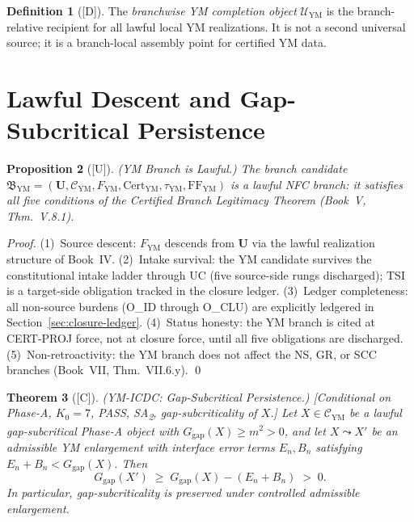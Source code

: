 \documentclass[12pt,oneside]{amsbook}
\theoremstyle{plain}
\newtheorem{theorem}{Theorem}[section]
\newtheorem{proposition}[theorem]{Proposition}
\theoremstyle{definition}
\newtheorem{definition}[theorem]{Definition}
\theoremstyle{remark}
\newcommand{\status}[1]{\textup{[#1]}}
\begin{document}
\begin{definition}[\status{D}]\label{def:YM-branchwise-completion}
The \emph{branchwise YM completion object} $\mathcal{U}_{\mathrm{YM}}$
is the branch-relative recipient for all lawful local YM
realizations. It is not a second universal source; it is a
branch-local assembly point for certified YM data.
\end{definition}

\section{Lawful Descent and Gap-Subcritical Persistence}
\label{sec:descent}

\begin{proposition}[\status{U}]\label{prop:YM-lawful}
\textup{(YM Branch is Lawful.)} The branch candidate
$\mathfrak{B}_{\mathrm{YM}} = (\mathbf{U}, \mathcal{C}_{\mathrm{YM}},
F_{\mathrm{YM}}, \mathrm{Cert}_{\mathrm{YM}},
\tau_{\mathrm{YM}}, \mathrm{FF}_{\mathrm{YM}})$
is a lawful NFC branch: it satisfies all five conditions of the
Certified Branch Legitimacy Theorem (Book~V, Thm.~V.8.1).
\end{proposition}

\begin{proof}
(1)~Source descent: $F_{\mathrm{YM}}$ descends from $\mathbf{U}$
via the lawful realization structure of Book~IV.
(2)~Intake survival: the YM candidate survives the constitutional
intake ladder through UC (five source-side rungs discharged); TSI
is a target-side obligation tracked in the closure ledger.
(3)~Ledger completeness: all non-source burdens (O\_ID through
O\_CLU) are explicitly ledgered in Section~\ref{sec:closure-ledger}.
(4)~Status honesty: the YM branch is cited at CERT-PROJ force,
not at closure force, until all five obligations are discharged.
(5)~Non-retroactivity: the YM branch does not affect the NS, GR,
or SCC branches (Book~VII, Thm.~VII.6.y).
\qed
\end{proof}

\begin{theorem}[\status{C}]\label{thm:YM-ICDC}
\textup{(YM-ICDC: Gap-Subcritical Persistence.)}
\textup{[Conditional on Phase-A, $K_0=7$, PASS, SA\textsubscript{2},
gap-subcriticality of $X$.]}
Let $X \in \mathcal{C}_{\mathrm{YM}}$ be a lawful gap-subcritical
Phase-A object with $G_{\mathrm{gap}}(X) \geq m^2 > 0$, and let
$X \leadsto X'$ be an admissible YM enlargement with interface
error terms $E_n, B_n$ satisfying
$E_n + B_n < G_{\mathrm{gap}}(X)$. Then
\[
 G_{\mathrm{gap}}(X') \;\geq\; G_{\mathrm{gap}}(X) - (E_n + B_n)
 \;>\; 0.
\]
In particular, gap-subcriticality is preserved under controlled
admissible enlargement.
\end{theorem}
\end{document}
